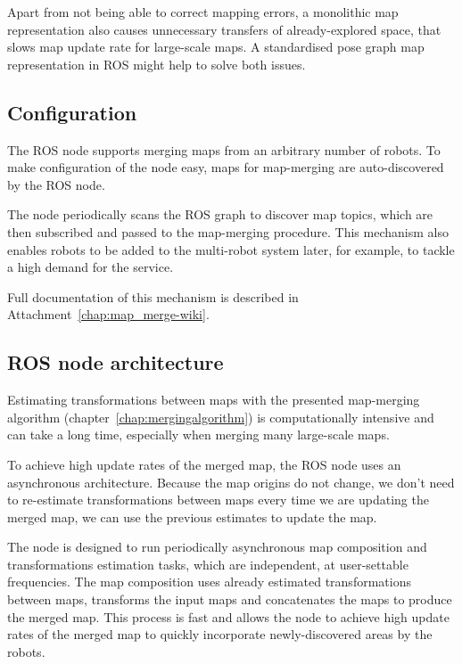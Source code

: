 Apart from not being able to correct mapping errors, a monolithic map representation also causes unnecessary transfers of already-explored space, that slows map update rate for large-scale maps. A standardised pose graph map representation in \gls{ROS} might help to solve both issues.


\subsection{Configuration}
\label{sec:configuration}

The \gls{ROS} node supports merging maps from an arbitrary number of robots. To make configuration of the node easy, maps for map-merging are auto-discovered by the \gls{ROS} node.

The node periodically scans the \gls{ROS} graph to discover map topics, which are then subscribed and passed to the map-merging procedure. This mechanism also enables robots to be added to the multi-robot system later, for example, to tackle a high demand for the service.

Full documentation of this mechanism is described in Attachment~\ref{chap:map_merge-wiki}.

\subsection{ROS node architecture}
\label{sec:node-architecture}

Estimating transformations between maps with the presented map-merging algorithm (chapter~\ref{chap:mergingalgorithm}) is computationally intensive and can take a long time, especially when merging many large-scale maps.

To achieve high update rates of the merged map, the \gls{ROS} node uses an asynchronous architecture. Because the map origins do not change, we don't need to re-estimate transformations between maps every time we are updating the merged map, we can use the previous estimates to update the map.

The node is designed to run periodically asynchronous map composition and transformations estimation tasks, which are independent, at user-settable frequencies. The map composition uses already estimated transformations between maps, transforms the input maps and concatenates the maps to produce the merged map. This process is fast and allows the node to achieve high update rates of the merged map to quickly incorporate newly-discovered areas by the robots.

